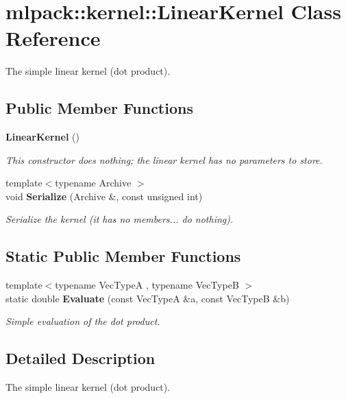 \section{mlpack\+:\+:kernel\+:\+:Linear\+Kernel Class Reference}
\label{classmlpack_1_1kernel_1_1LinearKernel}


The simple linear kernel (dot product).  


\subsection*{Public Member Functions}
\begin{DoxyCompactItemize}
\item 
{\bf Linear\+Kernel} ()
\begin{DoxyCompactList}\small\item\em This constructor does nothing; the linear kernel has no parameters to store. \end{DoxyCompactList}\item 
{\footnotesize template$<$typename Archive $>$ }\\void {\bf Serialize} (Archive \&, const unsigned int)
\begin{DoxyCompactList}\small\item\em Serialize the kernel (it has no members... do nothing). \end{DoxyCompactList}\end{DoxyCompactItemize}
\subsection*{Static Public Member Functions}
\begin{DoxyCompactItemize}
\item 
{\footnotesize template$<$typename Vec\+TypeA , typename Vec\+TypeB $>$ }\\static double {\bf Evaluate} (const Vec\+TypeA \&a, const Vec\+TypeB \&b)
\begin{DoxyCompactList}\small\item\em Simple evaluation of the dot product. \end{DoxyCompactList}\end{DoxyCompactItemize}


\subsection{Detailed Description}
The simple linear kernel (dot product). 

